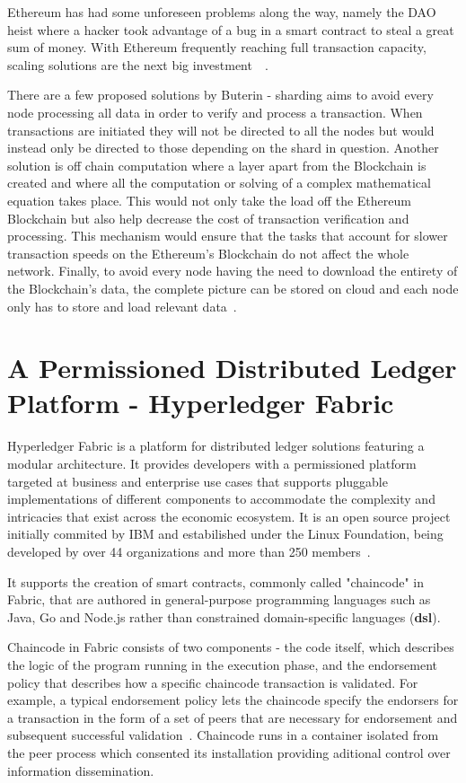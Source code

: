 Ethereum has had some unforeseen problems along the way, namely the DAO heist
where a hacker took advantage of a bug in a smart contract to steal a great sum
of money. With Ethereum frequently reaching full transaction capacity, scaling
solutions are the next big investment~~\cite{ethereumScalability2018}.

There are a few proposed solutions by Buterin - sharding aims to avoid every
node processing all data in order to verify and process a transaction. When
transactions are initiated they will not be directed to all the nodes but would
instead only be directed to those depending on the shard in question.  Another
solution is off chain computation where a layer apart from the Blockchain is
created and where all the computation or solving of a complex mathematical
equation takes place. This would not only take the load off the Ethereum
Blockchain but also help decrease the cost of transaction verification and
processing. This mechanism would ensure that the tasks that account for slower
transaction speeds on the Ethereum’s Blockchain do not affect the whole
network. Finally, to avoid every node having the need to download the entirety
of the Blockchain's data, the complete picture can be stored on cloud and each
node only has to store and load relevant
data~\cite{ethereumBlogScalability2018}.

\section{A Permissioned Distributed Ledger Platform - Hyperledger Fabric}
\label{distributedLedgerPlatform}

Hyperledger Fabric is a platform for distributed ledger solutions featuring a
modular architecture. It provides developers with a permissioned platform
targeted at business and enterprise use cases that supports pluggable
implementations of different components to accommodate the complexity and
intricacies that exist across the economic ecosystem. It is an open source
project initially commited by IBM  and estabilished under the Linux Foundation,
being developed by over 44 organizations and more than 250
members~\cite{HyperledgerFabricDocs2017,HyperledgerGrowth2018}.

It supports the creation of smart contracts, commonly called "chaincode" in
Fabric, that are authored in general-purpose programming languages such as
Java, Go and Node.js rather than constrained domain-specific languages
(\textbf{dsl}). 

Chaincode in Fabric consists of two components - the code itself, which
describes the logic of the program running in the execution phase, and the
endorsement policy that describes how a specific chaincode transaction is
validated. For example, a typical endorsement policy lets the chaincode specify
the endorsers for a transaction in the form of a set of peers that are
necessary for endorsement and subsequent successful
validation~\cite{Androulaki2018}. Chaincode runs in a container isolated from
the peer process which consented its installation providing aditional control
over information dissemination.

